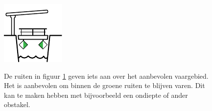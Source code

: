 \begin{figure}[H]
	\centering
	\begin{minipage}[b]{0.18\textwidth}
		\includegraphics[width=\textwidth,]{Hoofdstukken/Bruggen/pdf/brug_aanbevolen_gebied.pdf}
		\caption{}
		\label{pic:brug:gebied}
	\end{minipage}
	\hfill
	\begin{minipage}[t]{0.75\textwidth}
		\vspace{-2.5cm}
		De ruiten in figuur \ref{pic:brug:gebied} geven iets aan over het aanbevolen vaargebied. Het is aanbevolen om binnen de groene ruiten te blijven varen. Dit kan te maken hebben met bijvoorbeeld een ondiepte of ander obstakel.
	\end{minipage}
\end{figure}
\vspace{-0.75cm}
